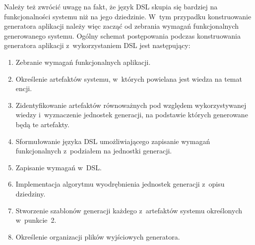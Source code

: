 Należy też zwrócić uwagę na fakt, że język DSL skupia się bardziej na funkcjonalności systemu niż na jego dziedzinie.
W~tym przypadku konstruowanie generatora aplikacji należy więc zacząć od zebrania wymagań funkcjonalnych generowanego systemu.
Ogólny schemat postępowania podczas konstruowania generatora aplikacji z~wykorzystaniem DSL jest następujący:

\begin{enumerate}
 \item Zebranie wymagań funkcjonalnych aplikacji.
 \item Określenie artefaktów systemu, w~których powielana jest wiedza na temat encji.
 \item Zidentyfikowanie artefaktów równoważnych pod względem wykorzystywanej wiedzy i~wyznaczenie jednostek generacji, na podstawie których generowane będą te artefakty.
 \item Sformułowanie języka DSL umożliwiającego zapisanie wymagań funkcjonalnych z~podziałem na jednostki generacji.
 \item Zapisanie wymagań w~DSL.
 \item Implementacja algorytmu wyodrębnienia jednostek generacji z~opisu dziedziny.
 \item Stworzenie szablonów generacji każdego z~artefaktów systemu określonych w~punkcie~2.
 \item Określenie organizacji plików wyjściowych generatora.
\end{enumerate}
